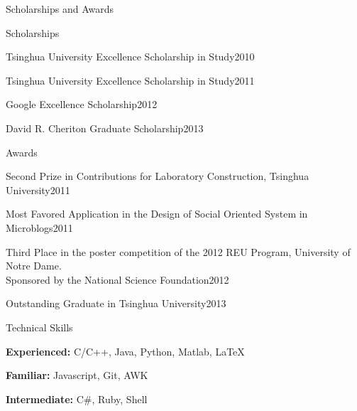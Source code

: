 \documentclass{resume} %
\begin{document}
\begin{rSection}{Scholarships and Awards}
\begin{rSubsection}{Scholarships}{}{}{}
\item{Tsinghua University Excellence Scholarship in Study\hfill{2010}}
\item{Tsinghua University Excellence Scholarship in Study\hfill{2011}}
\item{Google Excellence Scholarship\hfill{2012}}
\item{David R. Cheriton Graduate Scholarship\hfill{2013}}
\end{rSubsection}
\begin{rSubsection}{Awards}{}{}{}
\item{Second Prize in Contributions for Laboratory Construction, Tsinghua University\hfill{2011}}
\item{Most Favored Application in the Design of Social Oriented System in Microblogs\hfill{2011}}
\item{Third Place in the poster competition of the 2012 REU Program, University of Notre Dame.\\ Sponsored by the National Science Foundation\hfill{2012}}
\item{Outstanding Graduate in Tsinghua University\hfill{2013}}
\end{rSubsection}
\end{rSection}



\begin{rSection}{Technical Skills}
\item{}\textbf{Experienced: }C/C++, Java, Python, Matlab, LaTeX
\item{}\textbf{Familiar: }Javascript, Git, AWK
\item{}\textbf{Intermediate: }C\#, Ruby, Shell
\end{rSection}
\end{document}
